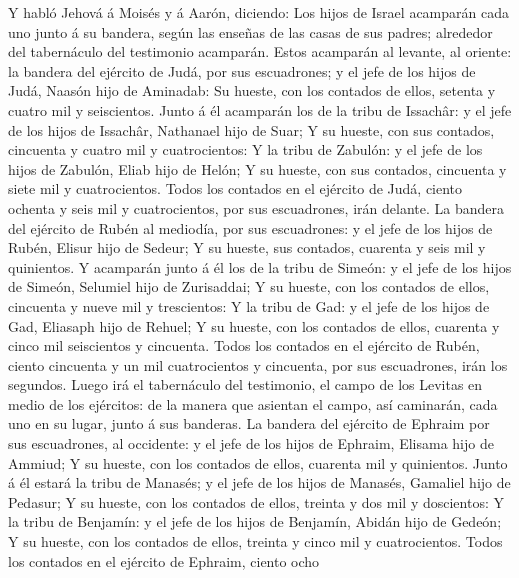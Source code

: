  Y habló Jehová á Moisés y á Aarón, diciendo: 
Los hijos de Israel acamparán cada uno junto á su bandera, según las
enseñas de las casas de sus padres; alrededor del tabernáculo del
testimonio acamparán.  Estos acamparán al levante, al
oriente: la bandera del ejército de Judá, por sus escuadrones; y el jefe
de los hijos de Judá, Naasón hijo de Aminadab:  Su hueste,
con los contados de ellos, setenta y cuatro mil y seiscientos.
 Junto á él acamparán los de la tribu de Issachâr: y el jefe
de los hijos de Issachâr, Nathanael hijo de Suar;  Y su
hueste, con sus contados, cincuenta y cuatro mil y cuatrocientos:
 Y la tribu de Zabulón: y el jefe de los hijos de Zabulón,
Eliab hijo de Helón;  Y su hueste, con sus contados,
cincuenta y siete mil y cuatrocientos.  Todos los contados
en el ejército de Judá, ciento ochenta y seis mil y cuatrocientos, por
sus escuadrones, irán delante.  La bandera del ejército de
Rubén al mediodía, por sus escuadrones: y el jefe de los hijos de Rubén,
Elisur hijo de Sedeur;  Y su hueste, sus contados, cuarenta
y seis mil y quinientos.  Y acamparán junto á él los de la
tribu de Simeón: y el jefe de los hijos de Simeón, Selumiel hijo de
Zurisaddai;  Y su hueste, con los contados de ellos,
cincuenta y nueve mil y trescientos:  Y la tribu de Gad: y
el jefe de los hijos de Gad, Eliasaph hijo de Rehuel;  Y su
hueste, con los contados de ellos, cuarenta y cinco mil seiscientos y
cincuenta.  Todos los contados en el ejército de Rubén,
ciento cincuenta y un mil cuatrocientos y cincuenta, por sus
escuadrones, irán los segundos.  Luego irá el tabernáculo
del testimonio, el campo de los Levitas en medio de los ejércitos: de la
manera que asientan el campo, así caminarán, cada uno en su lugar, junto
á sus banderas.  La bandera del ejército de Ephraim por sus
escuadrones, al occidente: y el jefe de los hijos de Ephraim, Elisama
hijo de Ammiud;  Y su hueste, con los contados de ellos,
cuarenta mil y quinientos.  Junto á él estará la tribu de
Manasés; y el jefe de los hijos de Manasés, Gamaliel hijo de Pedasur;
 Y su hueste, con los contados de ellos, treinta y dos mil
y doscientos:  Y la tribu de Benjamín: y el jefe de los
hijos de Benjamín, Abidán hijo de Gedeón;  Y su hueste, con
los contados de ellos, treinta y cinco mil y cuatrocientos.
 Todos los contados en el ejército de Ephraim, ciento ocho
